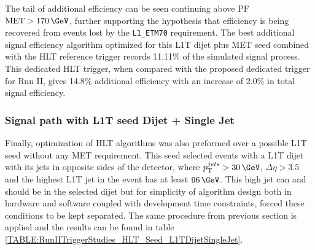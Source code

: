 The tail of additional efficiency can be seen continuing above \gls{PF} $\text{MET}>170\,\GeV$, further supporting the hypothesis that efficiency is being recovered from events lost by the \verb|L1_ETM70| requirement. The best additional signal efficiency algorithm optimized for this \gls{L1T} dijet plus \gls{MET} seed combined with the \gls{HLT} reference trigger records 11.11\% of the simulated signal process. This dedicated \gls{HLT} trigger, when compared with the proposed dedicated trigger for Run II, gives 14.8\% additional efficiency with an increase of 2.0\% in total signal efficiency.

\subsubsection{Signal path with L1T seed Dijet + Single Jet}
\label{SECTION:RunIITriggerStudies_HLTAlgorithmDevelopment_L1TDijetSingleJet}


Finally, optimization of \gls{HLT} algorithms was also preformed over a possible \gls{L1T} seed without any \gls{MET} requirement. This seed selected events with a \gls{L1T} dijet with its jets in opposite sides of the detector, where $\pt^{jets}>30\,\GeV$, $\Delta\eta>3.5$ and the highest \pt \gls{L1T} jet in the event has at least $96\,\GeV$. This high \pt jet can and should be in the selected dijet but for simplicity of algorithm design both in hardware and software coupled with development time constraints, forced these conditions to be kept separated. The same procedure from previous section is applied and the results can be found in table \ref{TABLE:RunIITriggerStudies_HLT_Seed_L1TDijetSingleJet}.

